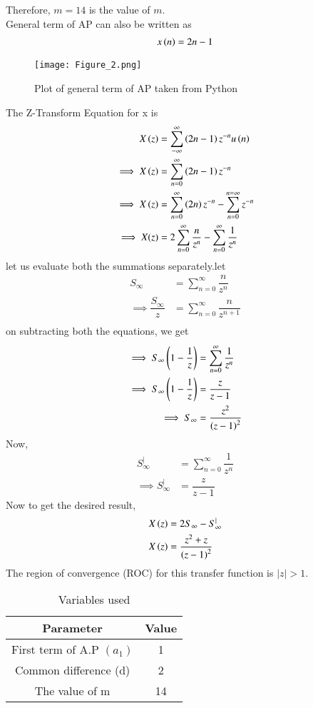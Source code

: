 \documentclass[journal,12pt,twocolumn]{IEEEtran}
\theoremstyle{remark}
\begin{document}
Therefore, $m = 14$ is the value of $m$.\\
General term of AP can also be written as 
\begin{align}
    x\left(n\right)=2n-1
\end{align}
\begin{figure}[h]
    \centering
    \texttt{[image: Figure\_2.png]}
    \caption{Plot of general term of AP taken from Python}
    \label{fig:1}
\end{figure}
The Z-Transform Equation for x is 
\begin{align}
    X\left(z\right)&=\sum_{-\infty}^{\infty}\left(2n-1\right)z^{-n}u\left(n\right) \\
   \implies X\left(z\right)&=\sum_{n=0}^{\infty}\left(2n-1\right)z^{-n} \\
   \implies X\left(z\right)&=\sum_{n=0}^{\infty}\left(2n\right)z^{-n} -\sum_{n=0}^{n=\infty}z^{-n}\\
   \implies X(z)&=2\sum_{n=0}^{\infty}\dfrac{n}{z^{n}}-\sum_{n=0}^{\infty}\dfrac{1}{z^{n}}
\end{align}
let us evaluate both the summations separately.let
\begin{align}
   S_\infty&=\sum_{n=0}^{\infty}\dfrac{n}{z^{n}}\\
   \implies \dfrac{S_\infty}{z}&=\sum_{n=0}^{\infty}\dfrac{n}{z^{n+1}}\\
\end{align}
on subtracting both the equations, we get
\begin{align}
   \implies S_\infty\left(1-\dfrac{1}{z}\right)&=\sum_{n=0}^{\infty}\dfrac{1}{z^{n}}\\
   \implies S_\infty\left(1-\dfrac{1}{z}\right)&=\dfrac{z}{z-1}\\
   \implies S_\infty&=\dfrac{z^2}{\left(z-1\right)^{2}}
\end{align}
Now,
\begin{align}
    S_{\infty}^{|}&=\sum_{n=0}^{\infty}\dfrac{1}{z^{n}}\\
    \implies S_{\infty}^{|}&=\dfrac{z}{z-1}
\end{align}
Now to get the desired result,
\begin{align}
    X\left(z\right)&=2S_\infty-S_{\infty}^{|}\\
    X\left(z\right)&=\dfrac{z^2+z}{\left(z-1\right)^{2}}
\end{align}
The region of convergence (ROC) for this transfer function is \(|z| > 1\).
\begin{table}[h!]
\begin{center}
\renewcommand\thetable{1}
\begin{tabular}{ |c|c|  } 
  \hline
    Parameter & Value  \\ 
  \hline
  First term of A.P $(a_1)$ & 1  \\ 
  \hline
  Common difference (d) & 2 \\ 
  \hline
  The value of m & 14 \\
  \hline
\end{tabular}
\end{center}
\caption{Variables used}
\end{table}
\end{document}

